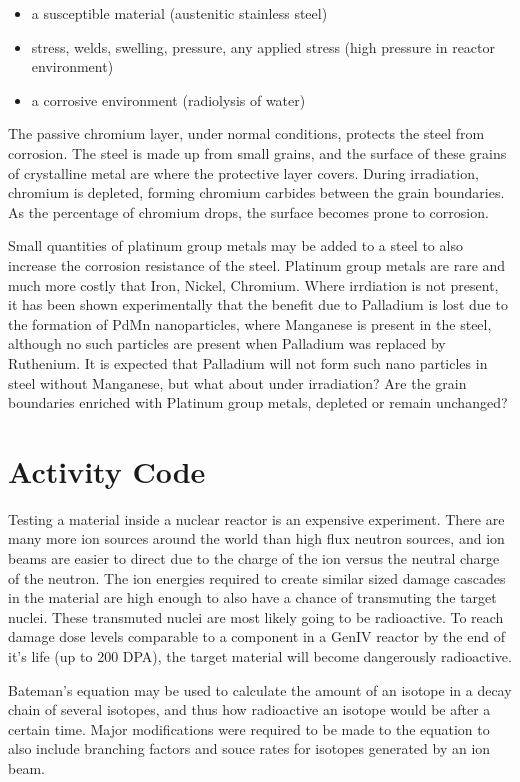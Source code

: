 \begin{itemize}
\item a susceptible material (austenitic stainless steel)
\item stress, welds, swelling, pressure, any applied stress (high pressure in reactor environment)
\item a corrosive environment (radiolysis of water)
\end{itemize}

The passive chromium layer, under normal conditions, protects the steel from corrosion.  The steel is made up from small grains, and the surface of these grains of crystalline metal are where the protective layer covers.  During irradiation, chromium is depleted, forming chromium carbides between the grain boundaries.  As the percentage of chromium drops, the surface becomes prone to corrosion.

Small quantities of platinum group metals may be added to a steel to also increase the corrosion resistance of the steel.  Platinum group metals are rare and much more costly that Iron, Nickel, Chromium.  Where irrdiation is not present, it has been shown experimentally that the benefit due to Palladium is lost due to the formation of PdMn nanoparticles, where Manganese is present in the steel, although no such particles are present when Palladium was replaced by Ruthenium.  It is expected that Palladium will not form such nano particles in steel without Manganese, but what about under irradiation?  Are the grain boundaries enriched with Platinum group metals, depleted or remain unchanged?


\section{Activity Code}

Testing a material inside a nuclear reactor is an expensive experiment.  There are many more ion sources around the world than high flux neutron sources, and ion beams are easier to direct due to the charge of the ion versus the neutral charge of the neutron.  The ion energies required to create similar sized damage cascades in the material are high enough to also have a chance of transmuting the target nuclei.  These transmuted nuclei are most likely going to be radioactive.  To reach damage dose levels comparable to a component in a GenIV reactor by the end of it's life (up to 200 DPA), the target material will become dangerously radioactive. 

Bateman's equation may be used to calculate the amount of an isotope in a decay chain of several isotopes, and thus how radioactive an isotope would be after a certain time.  Major modifications were required to be made to the equation to also include branching factors and souce rates for isotopes generated by an ion beam.

